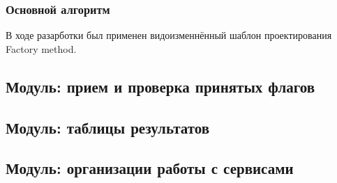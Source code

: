\subsubsection{Основной алгоритм}
В ходе разарботки был применен видоизменнённый шаблон проектирования Factory method.


\subsection{Модуль: прием и проверка принятых флагов} %


\subsection{Модуль: таблицы результатов} %


\subsection{Модуль: организации работы с сервисами} %


\clearpage
